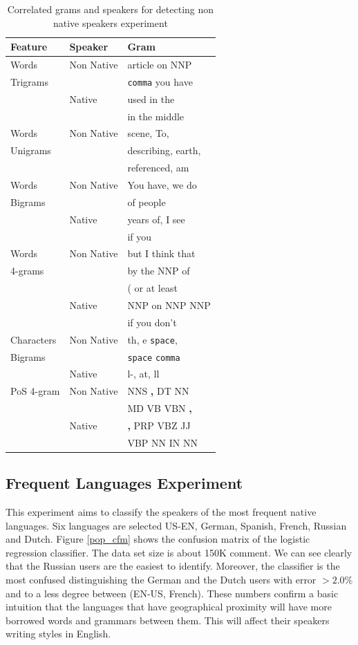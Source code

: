\documentclass[11pt]{article}
\begin{document}
\begin{table}[htp]
\begin{tabular}{l|ll}
	Feature & Speaker  & Gram
	\\\hline
	Words & Non Native &article on NNP\\
	 Trigrams& &  \verb+comma+ you have\\
	 & Native& used in the\\
	 &  &in the middle\\\hline
	 
	Words &Non Native& scene, To,\\
	   Unigrams&&describing, earth,\\
	    && referenced, am\\\hline
	    
	Words 	&Non Native& You have, we do\\
	Bigrams&& of people\\
	&Native& years of, I see\\
	&&if you\\\hline

	Words &Non Native& but I think that\\
	4-grams	&&by the NNP of\\
		&&( or at least\\
		&Native&NNP on NNP NNP\\
		&&if you don't\\\hline

	Characters&Non Native& th, e \verb+space+,\\
	Bigrams && \verb+space+ \verb+comma+\\
	&Native& l-, at, ll\\\hline
	
	PoS 4-gram &Non Native& NNS \textbf{,} DT NN\\
	&& MD VB VBN \textbf{,}\\
	&Native& \textbf{,} PRP VBZ JJ\\
	&& VBP NN IN NN\\
	
\end{tabular}
\label{table:nonnative}
\caption{Correlated grams and speakers for detecting non native speakers experiment}
\end{table}


\subsection{Frequent Languages Experiment}
This experiment aims to classify the speakers of the most frequent native languages. Six languages are selected US-EN, German, Spanish, French, Russian and Dutch. Figure \ref{pop_cfm} shows the confusion matrix of the logistic regression classifier. The data set size is about 150K comment. We can see clearly that the Russian users are the easiest to identify. Moreover, the classifier is the most confused distinguishing the German and the Dutch users with error $>2.0\%$ and to a less degree between (EN-US, French). These numbers confirm a basic intuition that the languages that have geographical proximity will have more borrowed words and grammars between them. This will affect their speakers writing styles in English.
\end{document}
